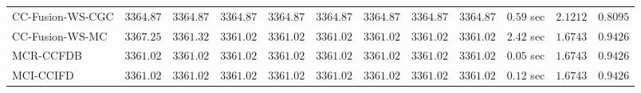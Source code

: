 \begin{table}[H]
\begin{tabular}{lrrrrrrrrrrr}
    CC-Fusion-WS-CGC & $      3364.87$ & $      3364.87$ & $      3364.87$ & $      3364.87$ & $      3364.87$ & $      3364.87$ & $      3364.87$ & $      3364.87$ & $         0.59$ sec    & $       2.1212$  & $       0.8095$ \\ 
     CC-Fusion-WS-MC & $      3367.25$ & $      3361.32$ & $      3361.02$ & $      3361.02$ & $      3361.02$ & $      3361.02$ & $      3361.02$ & $      3361.02$ & $         2.42$ sec    & $       1.6743$  & $       0.9426$ \\ 
\cmidrule{1-1} 
           MCR-CCFDB & $      3361.02$ & $      3361.02$ & $      3361.02$ & $      3361.02$ & $      3361.02$ & $      3361.02$ & $      3361.02$ & $      3361.02$ & $         0.05$ sec    & $       1.6743$  & $       0.9426$ \\ 
\cmidrule{1-1} 
           MCI-CCIFD & $      3361.02$ & $      3361.02$ & $      3361.02$ & $      3361.02$ & $      3361.02$ & $      3361.02$ & $      3361.02$ & $      3361.02$ & $         0.12$ sec    & $       1.6743$  & $       0.9426$ \\ 
\bottomrule
\end{tabular}
\end{table}

